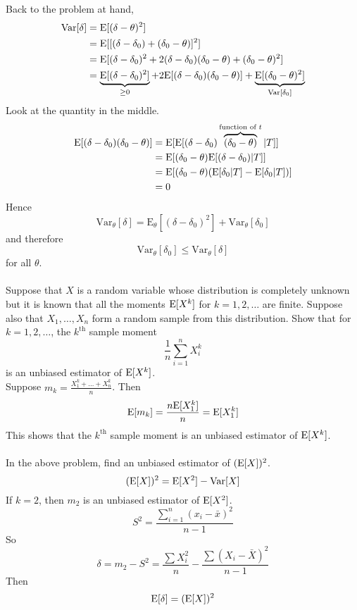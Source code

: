 \documentclass[12pt]{article}
\begin{document}
Back to the problem at hand, $$ \begin{aligned} \mathrm{Var}[ \delta ] &= \mathrm{E}[ (\delta - \theta)^2 ] \\ &= \mathrm{E}[ [(\delta - \delta_0) + (\delta_0 - \theta)]^2 ] \\ &= \mathrm{E}[ (\delta-\delta_0)^2 + 2(\delta-\delta_0)(\delta_0 - \theta) + (\delta_0 - \theta)^2 ] \\ &= \underbrace{\mathrm{E}[ (\delta - \delta_0)^2 ]}_{\geq 0} + 2\mathrm{E}[ (\delta-\delta_0)(\delta_0 - \theta) ] + \underbrace{\mathrm{E}[ (\delta_0 - \theta)^2 ]}_{\mathrm{Var}[ \delta_0 ]} \end{aligned} $$ Look at the quantity in the middle. $$ \begin{aligned} \mathrm{E}[ (\delta-\delta_0)(\delta_0 - \theta) ] &= \mathrm{E}[ \mathrm{E}[ (\delta-\delta_0)\overbrace{(\delta_0 - \theta)}^{\text{function of }t} | T ] ] \\ &= \mathrm{E}[ (\delta_0 - \theta)\mathrm{E}[ (\delta-\delta_0) | T ] ] \\ &= \mathrm{E}[ (\delta_0 - \theta)(\mathrm{E}[ \delta_0 | T ] - \mathrm{E}[ \delta_0 | T ]) ] \\ &= 0 \end{aligned} $$ Hence $$ \mathrm{Var}_\theta[\delta] = \mathrm{E}_\theta[(\delta - \delta_0)^2] + \mathrm{Var}_\theta[\delta_0] $$ and therefore $$ \mathrm{Var}_\theta[\delta_0] \leq \mathrm{Var}_\theta[\delta]$$ for all $\theta$. \\~\\

Suppose that $X$ is a random variable whose distribution is completely unknown but it is known that all the moments $\mathrm{E}[ X^k ]$ for $k=1,2,\dots$ are finite. Suppose also that $X_1,\dots,X_n$ form a random sample from this distribution. Show that for $k=1,2,\dots$, the $k^\text{th}$ sample moment $$ \frac{1}{n} \sum_{i=1}^n X_i^k$$ is an unbiased estimator of $\mathrm{E}[ X^k ]$. \\ 
Suppose $m_k = \frac{X_1^k + \dots + X_n^k}{n}$. Then 
$$ \mathrm{E}[ m_k ] = \frac{n\mathrm{E}[ X_1^k ]}{n} = \mathrm{E}[ X_1^k ] $$ This shows that the $k^\text{th}$ sample moment is an unbiased estimator of $\mathrm{E}[ X^k ]$. \\~\\
In the above problem, find an unbiased estimator of $(\mathrm{E}[ X ])^2$. 
$$ (\mathrm{E}[ X ])^2 = \mathrm{E}[ X^2 ] - \mathrm{Var}[ X ]$$ If $k=2$, then $m_2$ is an unbiased estimator of $\mathrm{E}[ X^2 ]$. $$ S^2 = \frac{\sum_{i=1}^n (x_i - \bar{x})^2}{n-1}$$ So $$\delta = m_2 - S^2 = \frac{\sum X_i^2}{n} - \frac{\sum (X_i - \bar{X})^2}{n-1} $$ Then $$\mathrm{E}[ \delta ] = (\mathrm{E}[ X ])^2 $$ 
\end{document}
